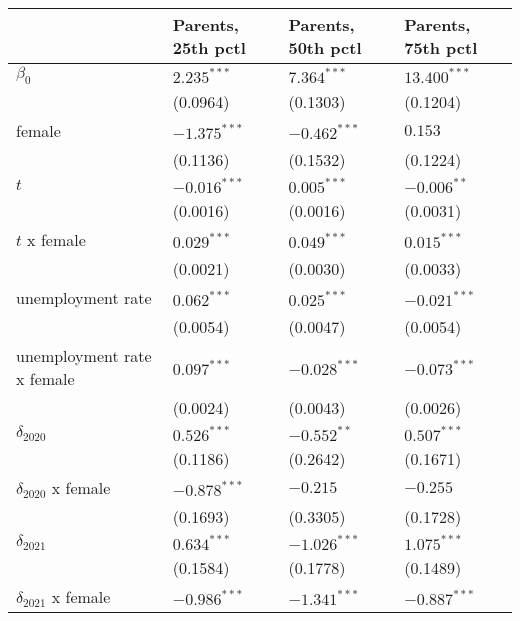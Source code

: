 \begin{tabular}{llll}
\toprule
{} & Parents, 25th pctl & Parents, 50th pctl & Parents, 75th pctl \\
\midrule
$\beta_0$                  &      $2.235^{***}$ &      $7.364^{***}$ &     $13.400^{***}$ \\
                           &           (0.0964) &           (0.1303) &           (0.1204) \\
female                     &     $-1.375^{***}$ &     $-0.462^{***}$ &            $0.153$ \\
                           &           (0.1136) &           (0.1532) &           (0.1224) \\
$t$                        &     $-0.016^{***}$ &      $0.005^{***}$ &      $-0.006^{**}$ \\
                           &           (0.0016) &           (0.0016) &           (0.0031) \\
$t$ x female               &      $0.029^{***}$ &      $0.049^{***}$ &      $0.015^{***}$ \\
                           &           (0.0021) &           (0.0030) &           (0.0033) \\
unemployment rate          &      $0.062^{***}$ &      $0.025^{***}$ &     $-0.021^{***}$ \\
                           &           (0.0054) &           (0.0047) &           (0.0054) \\
unemployment rate x female &      $0.097^{***}$ &     $-0.028^{***}$ &     $-0.073^{***}$ \\
                           &           (0.0024) &           (0.0043) &           (0.0026) \\
$\delta_{2020}$            &      $0.526^{***}$ &      $-0.552^{**}$ &      $0.507^{***}$ \\
                           &           (0.1186) &           (0.2642) &           (0.1671) \\
$\delta_{2020}$ x female   &     $-0.878^{***}$ &           $-0.215$ &           $-0.255$ \\
                           &           (0.1693) &           (0.3305) &           (0.1728) \\
$\delta_{2021}$            &      $0.634^{***}$ &     $-1.026^{***}$ &      $1.075^{***}$ \\
                           &           (0.1584) &           (0.1778) &           (0.1489) \\
$\delta_{2021}$ x female   &     $-0.986^{***}$ &     $-1.341^{***}$ &     $-0.887^{***}$ \\

\end{tabular}
